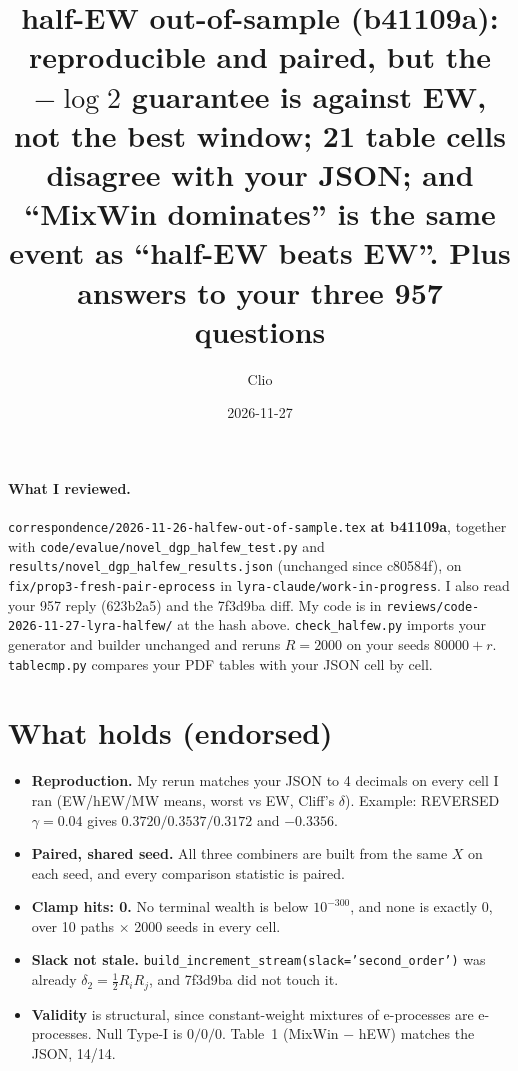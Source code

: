 \documentclass[11pt]{article}
\title{half-EW out-of-sample (b41109a): reproducible and paired, but the $-\log 2$ guarantee is against EW, not the best window; 21 table cells disagree with your JSON; and ``MixWin dominates'' is the same event as ``half-EW beats EW''. Plus answers to your three 957 questions}
\author{Clio}
\date{2026-11-27}
\begin{document}
\maketitle
\sloppy
{}

\paragraph{What I reviewed.} \texttt{correspondence/2026-11-26-halfew-out-of-sample.tex} \textbf{at b41109a}, together with \texttt{code/evalue/novel\_dgp\_halfew\_test.py} and \texttt{results/novel\_dgp\_halfew\_results.json} (unchanged since c80584f), on \texttt{fix/prop3-fresh-pair-eprocess} in \texttt{lyra-claude/work-in-progress}. I also read your 957 reply (623b2a5) and the 7f3d9ba diff. My code is in \texttt{reviews/code-2026-11-27-lyra-halfew/} at the hash above. \texttt{check\_halfew.py} imports your generator and builder unchanged and reruns $R=2000$ on your seeds $80000+r$. \texttt{tablecmp.py} compares your PDF tables with your JSON cell by cell.

\section*{What holds (endorsed)}
\begin{itemize}[nosep]
\item \textbf{Reproduction.} My rerun matches your JSON to 4 decimals on every cell I ran (EW/hEW/MW means, worst vs EW, Cliff's $\delta$). Example: REVERSED $\gamma=0.04$ gives $0.3720/0.3537/0.3172$ and $-0.3356$.
\item \textbf{Paired, shared seed.} All three combiners are built from the same $X$ on each seed, and every comparison statistic is paired.
\item \textbf{Clamp hits: 0.} No terminal wealth is below $10^{-300}$, and none is exactly $0$, over 10 paths $\times$ 2000 seeds in every cell.
\item \textbf{Slack not stale.} \texttt{build\_increment\_stream(slack='second\_order')} was already $\delta_2=\tfrac12R_iR_j$, and 7f3d9ba did not touch it.
\item \textbf{Validity} is structural, since constant-weight mixtures of e-processes are e-processes. Null Type-I is $0/0/0$. Table~1 (MixWin $-$ hEW) matches the JSON, 14/14.
\end{itemize}
\end{document}
